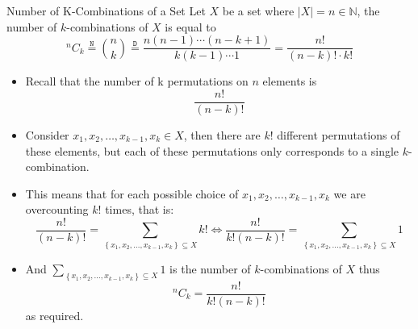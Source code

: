 \documentclass{standalone}
\begin{document}
\begin{defn*}{Number of K-Combinations of a Set}
Let $X$ be a set where $\left| X \right|=n \in \mathbb{N}$, the number of $k$-combinations of $X$  is equal to 
\[
	{{}^{n}\!C_{k}} \stackrel{\mathtt{N}}{=} \binom{n}{k} \stackrel{\mathtt{D}}{=}\frac{n \left( n-1 \right) \dotsb \left( n -k  + 1 \right)}{k \left( k-1 \right)\dotsb 1} = \frac{n!}{(n-k)!\cdot k!} 
\]
\begin{pf}
  \begin{itemize}
   \item Recall that the number of k permutations on $n$ elements is 
     \[
     \frac{n!}{ \left( n-k \right)!}
     \]
    \item Consider $ x_{1} , x_{2} , \dotsc  , x_{k - 1} , x_{k} \in X$, then there are $k!$ different permutations of these elements, but each of these permutations only corresponds to a single $k$-combination.
    \item This means that for each possible choice of $ x_{1} , x_{2} , \dotsc  , x_{k - 1} , x_{k}$ we are overcounting $k!$ times, that is:
      \[
      \frac{n!}{ \left(  n  - k \right)!} = \sum_{ \left\{ x_{1} , x_{2} , \dotsc  , x_{k - 1} , x_{k} \right\} \subseteq X} k! \Leftrightarrow \frac{n!}{ k! \left(  n  - k \right)!} = \sum_{ \left\{ x_{1} , x_{2} , \dotsc  , x_{k - 1} , x_{k} \right\} \subseteq X} 1
      \]
    \item And $\sum_{ \left\{ x_{1} , x_{2} , \dotsc  , x_{k - 1} , x_{k} \right\} \subseteq X} 1$ is the number of $k$-combinations of $X$ thus
      \[
      {{}^{n}\!C_{k}} = \frac{n!}{ k! \left(  n  - k \right)!} 
      \]
      as required.
  \end{itemize}

\end{pf}
\end{defn*}
\end{document}
